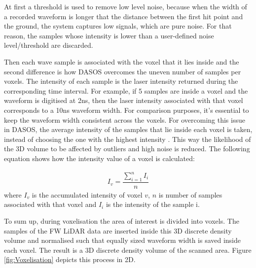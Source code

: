 \documentclass{subfiles}
\begin{document}
		
	\par At first a threshold is used to remove low level noise, because when the width of a recorded waveform is longer that the distance between the first hit point and the ground, the system captures low signals, which are pure noise. For that reason, the samples whose intensity is lower than a user-defined noise level/threshold are discarded. 
		
		
		\par Then each wave sample is associated with the voxel that it lies inside and the second difference is how DASOS overcomes the uneven number of samples per voxels. The intensity of each sample is the laser intensity returned during the corresponding time interval. For example, if 5 samples are inside a voxel and the waveform is digitised at 2ns, then the laser intensity associated with that voxel corresponds to a 10ns waveform width. For comparison purposes, it's essential to keep the waveform width consistent across the voxels. For overcoming this issue in DASOS, the average intensity of the samples that lie inside each voxel is taken, instead of choosing the one with the highest intensity \cite{Persson2005}. This way the likelihood of the 3D volume to be affected by outliers and high noise is reduced. The following equation shows how the intensity value of a voxel is calculated:
		
		\begin{eqnarray}
		I_{v} = \dfrac{\sum_{i=1}^{n}I_{i}}{n}
		\end{eqnarray} 
		where 		$I_{v}$ is the accumulated intensity of voxel $v$,
		$n$ is number of samples associated with that voxel and
		$I_{i}$ is the intensity of the sample i.
		
		To sum up, during voxelisation the area of interest is divided into voxels. The samples of the FW LiDAR data are inserted inside this 3D discrete density volume and normalised such that equally sized waveform width is saved inside each voxel. The result is a 3D discrete density volume of the scanned area. Figure \ref{fig:Voxelisation} depicts this process in 2D.
		
\end{document}
